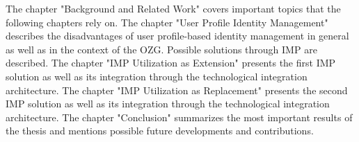 The chapter "Background and Related Work" covers important topics that the following chapters rely on. 
The chapter "User Profile Identity Management" describes the disadvantages of user profile-based identity management in general as well as in the context of the OZG. Possible solutions through IMP are described. 
The chapter "IMP Utilization as Extension" presents the first IMP solution as well as its integration through the technological integration architecture.
The chapter "IMP Utilization as Replacement" presents the second IMP solution as well as its integration through the technological integration architecture.
The chapter "Conclusion" summarizes the most important results of the thesis and mentions possible future developments and contributions.